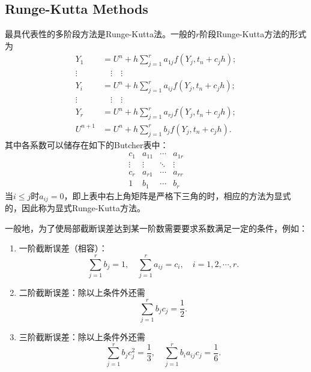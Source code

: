 \documentclass[a4paper,10pt]{ctexart}
\begin{document}
\subsection{Runge-Kutta Methods}
最具代表性的多阶段方法是Runge-Kutta法。一般的$ r $阶段Runge-Kutta方法的形式为
\begin{equation}
    \begin{aligned}
        Y_1 &= U^n + h \sum_{j=1}^r a_{1j} f(Y_j,t_n+c_jh);\\
        \vdots&\quad \vdots\quad \vdots\\
        Y_i &= U^n + h \sum_{j=1}^r a_{ij} f(Y_j,t_n+c_jh);\\
        \vdots&\quad \vdots\quad \vdots\\
        Y_r &= U^n + h \sum_{j=1}^r a_{rj} f(Y_j,t_n+c_jh);\\
        U^{n+1} &= U^n + h\sum_{j=1}^r b_j f(Y_j,t_n+c_jh).
    \end{aligned}
\end{equation}
其中各系数可以储存在如下的Butcher表中：
\begin{equation}\label{eq:RK}
    \begin{array}{c|ccc}
        c_1 & a_{11} & \cdots & a_{1r} \\
        \vdots & \vdots & \ddots & \vdots \\
        c_r & a_{r1} & \cdots & a_{rr} \\\hline
        1   & b_1 & \cdots & b_r
    \end{array}
\end{equation}
当$ i \leqslant j $时$ a_{ij} = 0 $，即上表中右上角矩阵是严格下三角的时，相应的方法为显式的，因此称为显式Runge-Kutta方法。

一般地，为了使局部截断误差达到某一阶数需要要求系数满足一定的条件，例如：
\begin{enumerate}
    \item 一阶截断误差（相容）：
    \[
        \sum_{j=1}^r b_j = 1,\quad \sum_{j=1}^r a_{ij} = c_i,\quad i = 1,2,\cdots,r.
    \]
    \item 二阶截断误差：除以上条件外还需
    \[
        \sum_{j=1}^r b_j c_j = \frac{1}{2}.
    \]
    \item 三阶截断误差：除以上条件外还需
    \[
        \sum_{j=1}^r b_j c_j^2 = \frac{1}{3},\quad \sum_{j=1}^r b_i a_{ij} c_j = \frac{1}{6}.
    \]
\end{enumerate}
\end{document}
